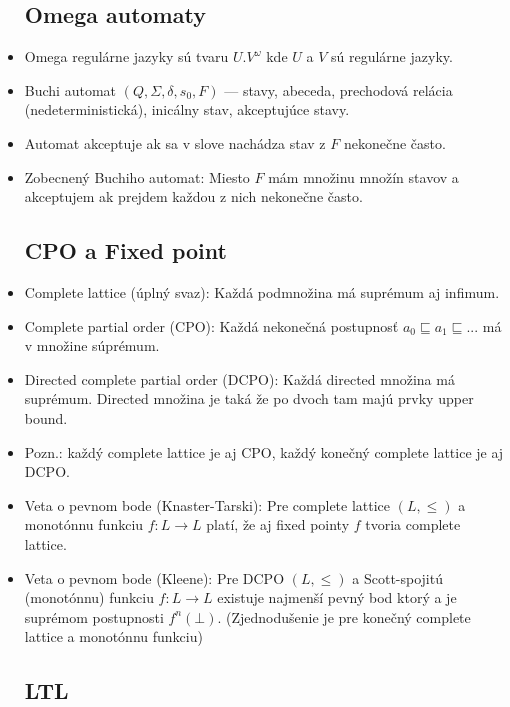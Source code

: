 \documentclass[paper=a4, fontsize=11pt]{scrartcl} %
\numberwithin{equation}{section} %
\numberwithin{figure}{section} %
\numberwithin{table}{section} %
\begin{document}
\begin{itemize}
	\subsection{Omega automaty}
	
	\item Omega regulárne jazyky sú tvaru $U.V^\omega$ kde $U$ a $V$ sú regulárne jazyky.
	
	\item Buchi automat $(Q, \Sigma, \delta, s_0, F)$ — stavy, abeceda, prechodová relácia (nedeterministická), inicálny stav, akceptujúce stavy.
	
	\item Automat akceptuje ak sa v slove nachádza stav z $F$ nekonečne často.
	
	\item Zobecnený Buchiho automat: Miesto $F$ mám množinu množín stavov a akceptujem ak prejdem každou z nich nekonečne často.
	
	\subsection{CPO a Fixed point}
	
	\item Complete lattice (úplný svaz): Každá podmnožina má suprémum aj infimum.
	
	\item Complete partial order (CPO): Každá nekonečná postupnosť $a_0 \sqsubseteq a_1 \sqsubseteq ...$ má v množine súprémum.
	
	\item Directed complete partial order (DCPO): Každá directed množina má suprémum. Directed množina je taká že po dvoch tam majú prvky upper bound.
	
	\item Pozn.: každý complete lattice je aj CPO, každý konečný complete lattice je aj DCPO.
	
	\item Veta o pevnom bode (Knaster-Tarski): Pre complete lattice $(L, \leq)$ a monotónnu funkciu $f: L \to L$ platí, že aj fixed pointy $f$ tvoria complete lattice.
	
	\item Veta o pevnom bode (Kleene): Pre DCPO $(L, \leq)$ a Scott-spojitú (monotónnu) funkciu $f: L \to L$ existuje najmenší pevný bod ktorý a je suprémom postupnosti $f^n(\bot)$. (Zjednodušenie je pre konečný complete lattice a monotónnu funkciu)
	
	\subsection{LTL}
	

\end{itemize}
\end{document}
